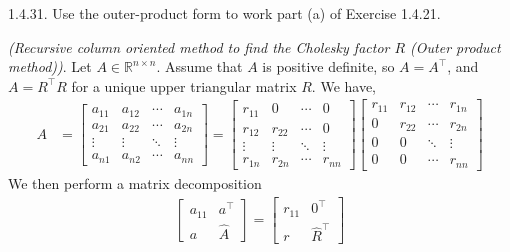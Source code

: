 \documentclass{report}
\begin{document}
    \pagebreak \bigbreak \noindent 
    \begin{mdframed}
        1.4.31. Use the outer-product form to work part (a) of Exercise 1.4.21. 
    \end{mdframed}
    \bigbreak \noindent 
    \begin{remark}
    \textit{(Recursive column oriented method to find the Cholesky factor $R$ (Outer product method))}. Let $A \in \mathbb{R}^{n\times n}$. Assume that $A$ is positive definite, so $A = A^{\top}$, and $A = R^{\top}R$ for a unique upper triangular matrix $R$. We have,
        \begin{align*}
            A &= \begin{bmatrix} a_{11} & a_{12} & \cdots & a_{1n} \\ a_{21} & a_{22} & \cdots & a_{2n} \\ \vdots & \vdots & \ddots & \vdots \\ a_{n1} & a_{n2} & \cdots & a_{nn} \end{bmatrix} = 
            \begin{bmatrix}
                r_{11} & 0  & \cdots & 0\\
                r_{12} & r_{22}  &  \cdots & 0 \\
                \vdots & \vdots & \ddots & \vdots\\
                r_{1n} & r_{2n} & \cdots & r_{nn}
            \end{bmatrix}
            \begin{bmatrix}
                r_{11} & r_{12} & \cdots & r_{1n} \\
                0 & r_{22} & \cdots & r_{2n} \\
                0 & 0 & \ddots & \vdots \\
                0 & 0  & \cdots & r_{nn}
            \end{bmatrix}
        \end{align*}
        We then perform a matrix decomposition 
        \begin{align*}
            \begin{bmatrix}
                a_{11} & a^{\top} \\
                a & \hat{A}
            \end{bmatrix}
            =
            \begin{bmatrix}
                r_{11} & 0^{\top} \\
                r & \hat{R}^{\top}
            \end{bmatrix}

\end{align*}
\end{remark}
\end{document}
